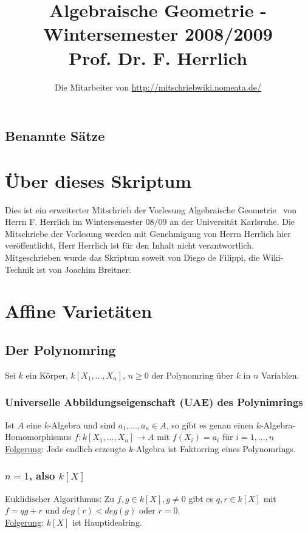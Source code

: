 \documentclass[a4paper,12pt]{report}
\title{Algebraische Geometrie - Wintersemester 2008/2009\\ Prof. Dr. F. Herrlich}
\author{Die Mitarbeiter von \url{http://mitschriebwiki.nomeata.de/}}
\theoremstyle{break}
\theoremstyle{nonumberbreak}
\theoremstyle{nonumberplain}
\begin{document}
\maketitle

\setlength\parskip{0.6pt}
\tableofcontents

\section*{Benannte Sätze}


\setlength\parskip{\smallskipamount}

\chapter{Über dieses Skriptum}
Dies ist ein erweiterter Mitschrieb der Vorlesung \glqq Algebraische Geometrie \grqq\ von Herrn F. Herrlich im Wintersemester 08/09 an der Universität Karlsruhe. Die Mitschriebe der Vorlesung werden mit Genehmigung von Herrn Herrlich hier veröffentlicht, Herr Herrlich ist für den Inhalt nicht verantwortlich. Mitgeschrieben wurde das Skriptum soweit von Diego de Filippi, die Wiki-Technik ist von Joachim Breitner.


\chapter{Affine Varietäten}
\section{Der Polynomring}
Sei $k$ ein Körper, $k[X_1,...,X_n]$, $n\geq 0$ der Polynomring über $k$ in $n$ Variablen.
\subsection{Universelle Abbildungseigenschaft (UAE) des Polynimrings}
Ist $A$ eine $k$-Algebra und sind $a_1,...,a_n\in A$, so gibt es genau einen $k$-Algebra-Homomorphismus $f: k[X_1,...,X_n] \rightarrow A$ mit $f(X_i)=a_i$ für $i= 1,...,n$\\
\underline{Folgerung}: Jede endlich erzeugte $k$-Algebra ist Faktorring eines Polynomrings.
\subsection{$n=1$, also $k[X]$}
Euklidischer Algorithmus: Zu $f,g\in k[X], g\neq 0$ gibt es $q,r \in k[X]$ mit $f=qg+r$ und $deg(r)<deg(g)$ oder $r=0$.\\
\underline{Folgerung}: $k[X]$ ist Hauptidealring.
\end{document}
